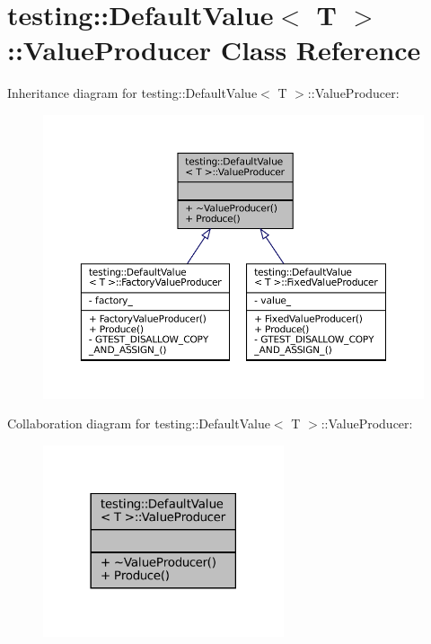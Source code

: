 \hypertarget{classtesting_1_1DefaultValue_1_1ValueProducer}{}\section{testing\+:\+:Default\+Value$<$ T $>$\+:\+:Value\+Producer Class Reference}
\label{classtesting_1_1DefaultValue_1_1ValueProducer}


Inheritance diagram for testing\+:\+:Default\+Value$<$ T $>$\+:\+:Value\+Producer\+:
\nopagebreak
\begin{figure}[H]
\begin{center}
\leavevmode
\includegraphics[width=350pt]{classtesting_1_1DefaultValue_1_1ValueProducer__inherit__graph}
\end{center}
\end{figure}


Collaboration diagram for testing\+:\+:Default\+Value$<$ T $>$\+:\+:Value\+Producer\+:
\nopagebreak
\begin{figure}[H]
\begin{center}
\leavevmode
\includegraphics[width=201pt]{classtesting_1_1DefaultValue_1_1ValueProducer__coll__graph}
\end{center}
\end{figure}
